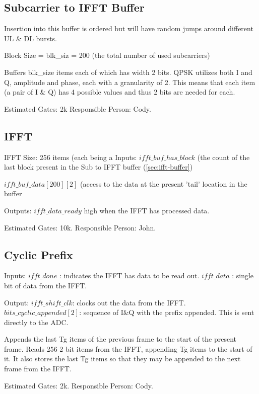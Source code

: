 \documentclass[10pt]{article}
\begin{document}
	\subsection{Subcarrier to IFFT Buffer}
	\label{sec:ifft-buffer}
	Insertion into this buffer is ordered but will have random jumps around
	different UL \& DL bursts.

	Block Size = blk\_siz = 200 (the total number of used subcarriers)
	
	Buffers blk\_size items each of which has
	width 2 bits. QPSK utilizes both I and Q, amplitude and phase, each with a
	granularity of 2. This means that each item (a pair of I \& Q) has 4
	possible values and thus 2 bits are needed for each.

	Estimated Gates: 2k
	Responsible Person: Cody.

	\subsection{IFFT}
	\label{sec:ifft}
	IFFT Size: 256 items (each being a 
	Inputs: 
		$ifft\_buf\_has\_block$ (the count of the last block
		present in the Sub to IFFT buffer (\autoref{sec:ifft-buffer})
		
		$ifft\_buf\_data[200][2]$ (access to the data at the present 'tail' location
		in the buffer
	
	Outputs:
		$ifft\_data\_ready$ high when the IFFT has processed data.

	Estimated Gates: 10k.
	Responsible Person: John.

	\subsection{Cyclic Prefix}
	\label{sec:cyclic_prefix}

	Inputs:
		$ifft\_done$ : indicates the IFFT has data to be read out.
		$ifft\_data$ : single bit of data from the IFFT.

	Output:
		$ifft\_shift\_clk$: clocks out the data from the IFFT.
		$bits\_cyclic\_appended[2]$: sequence of I\&Q with the prefix appended.
			This is sent directly to the ADC.


	Appends the last Tg items of the previous frame to the start of the
	present frame.  Reads 256 2 bit items from the IFFT, appending Tg items
	to the start of it. It also stores the last Tg items so that they may
	be appended to the next frame from the IFFT.

	Estimated Gates: 2k.
	Responsible Person: Cody.
\end{document}
